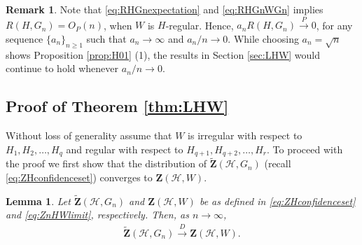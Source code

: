 \documentclass[11pt,reqno]{amsart}
\numberwithin{equation}{section}
\newcommand{\cH}{{\mathcal H}}
\newcommand{\ra}{\rightarrow}
\newcommand\dto{\overset{D}{\rightarrow}}
\newtheorem{lemma}{Lemma}[section]
\theoremstyle{definition}
\newtheorem{remark}{Remark}[section]
\begin{document}
\begin{remark} 
Note that \eqref{eq:RHGnexpectation} and \eqref{eq:RHGnWGn} implies $R(H,G_{n}) = O_P(n)$, when $W$ is $H$-regular. Hence, $a_n R(H,G_{n}) \overset{P}{\rightarrow} 0$, for any sequence $\{a_n\}_{n \geq 1}$ such that $a_n \rightarrow \infty$ and $a_n/n \rightarrow 0$. While choosing $a_n = \sqrt n$ shows Proposition \ref{prop:H01} (1), the results in Section \ref{sec:LHW} would continue to hold whenever $a_n/n \rightarrow 0$. 
\end{remark}




\subsection{Proof of Theorem \ref{thm:LHW}}\label{sec:confidencesetpf} 

Without loss of generality assume that $W$ is irregular with respect to $H_{1}, H_{2}, \ldots, H_{q}$ and regular with respect to $H_{q+1}, H_{q+2}, \ldots, H_{r}$. To proceed with the proof we first show that the distribution of $\tilde{\bm Z}(\cH, G_n)$ (recall \eqref{eq:ZHconfidenceset}) converges to $\bm Z(\cH, W)$. 

\begin{lemma}\label{lemma:Ztildeconvg}
    Let $\tilde{\bm Z}(\cH, G_{n})$ and $\bm Z(\cH,W)$ be as defined in \eqref{eq:ZHconfidenceset} and  \eqref{eq:ZnHWlimit}, respectively. Then, as $n\ra\infty$,
    \begin{align}\label{eq:ZSHGn}
        \tilde{\bm Z}(\cH, G_{n})\dto \bm Z(\cH,W).
    \end{align}
\end{lemma} 
\end{document}
